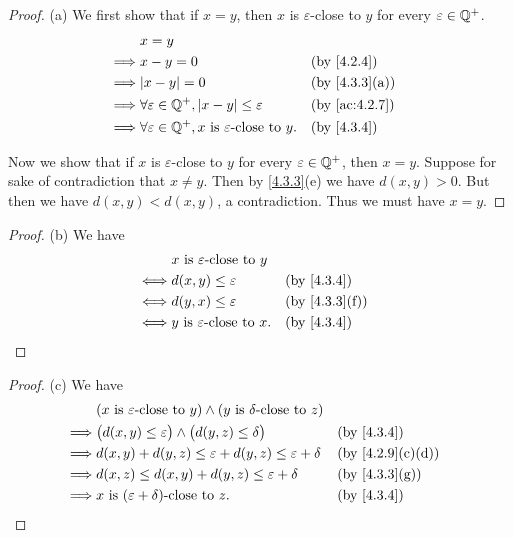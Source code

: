 \begin{proof}{(a)}
  We first show that if \(x = y\), then \(x\) is \(\varepsilon\)-close to \(y\) for every \(\varepsilon \in \mathbb{Q}^+\).
  \begin{align*}
             & x = y                                                                                                    \\
    \implies & x - y = 0                                                               &  & \by{4.2.4}                  \\
    \implies & \abs{x - y} = 0                                                         &  & \text{(by \cref{4.3.3}(a))} \\
    \implies & \forall \varepsilon \in \Q^+, \abs{x - y} \leq \varepsilon              &  & \text{(by \cref{ac:4.2.7})} \\
    \implies & \forall \varepsilon \in \Q^+, x \text{ is \(\varepsilon\)-close to } y. &  & \by{4.3.4}
  \end{align*}

  Now we show that if \(x\) is \(\varepsilon\)-close to \(y\) for every \(\varepsilon \in \mathbb{Q}^+\), then \(x = y\).
  Suppose for sake of contradiction that \(x \neq y\).
  Then by \cref{4.3.3}(e) we have \(d(x, y) > 0\).
  But then we have \(d(x, y) < d(x, y)\), a contradiction.
  Thus we must have \(x = y\).
\end{proof}

\begin{proof}{(b)}
  We have
  \begin{align*}
         & x \text{ is \(\varepsilon\)-close to } y                                   \\
    \iff & d(x, y) \leq \varepsilon                  &  & \by{4.3.4}                  \\
    \iff & d(y, x) \leq \varepsilon                  &  & \text{(by \cref{4.3.3}(f))} \\
    \iff & y \text{ is \(\varepsilon\)-close to } x. &  & \by{4.3.4}
  \end{align*}
\end{proof}

\begin{proof}{(c)}
  We have
  \begin{align*}
             & (x \text{ is \(\varepsilon\)-close to } y) \land (y \text{ is \(\delta\)-close to } z)                                     \\
    \implies & \big(d(x, y) \leq \varepsilon\big) \land \big(d(y, z) \leq \delta\big)                 &  & \by{4.3.4}                     \\
    \implies & d(x, y) + d(y, z) \leq \varepsilon + d(y, z) \leq \varepsilon + \delta                 &  & \text{(by \cref{4.2.9}(c)(d))} \\
    \implies & d(x, z) \leq d(x, y) + d(y, z) \leq \varepsilon + \delta                               &  & \text{(by \cref{4.3.3}(g))}    \\
    \implies & x \text{ is \((\varepsilon + \delta)\)-close to } z.                                   &  & \by{4.3.4}
  \end{align*}
\end{proof}

